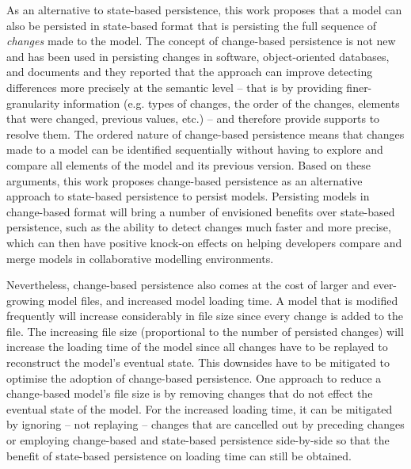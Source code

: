 \documentclass[12pt, a4paper]{report} \usepackage[titletoc]{appendix}
\begin{document}
As an alternative to state-based persistence, this work proposes that a model can also be persisted in state-based format that is persisting the full sequence of \emph{changes} made to the model. The concept of change-based persistence is not new and has been used in persisting changes in software, object-oriented databases, and documents \cite{DBLP:journals/entcs/RobbesL07,DBLP:conf/sde/LippeO92,DBLP:conf/caise/IgnatN05} and they reported that the approach can improve detecting differences more precisely at the semantic level -- that is by providing finer-granularity information (e.g. types of changes, the order of the changes, elements that were changed, previous values, etc.) -- and therefore provide supports to resolve them. The ordered nature of change-based persistence means that changes made to a model can be identified sequentially without having to explore and compare all elements of the model and its previous version. Based on these arguments, this work proposes change-based persistence as an alternative approach to state-based persistence to persist models. Persisting models in change-based format will bring a number of envisioned benefits over state-based persistence, such as the ability to detect changes much faster and more precise, which can then have positive knock-on effects on helping developers compare and merge models in collaborative modelling environments. 

Nevertheless, change-based persistence also comes at the cost of larger and ever-growing model files, and increased model loading time. A model that is modified frequently will increase considerably in file size since every change is added to the file. The increasing file size (proportional to the number of persisted changes) will increase the loading time of the model since all changes have to be replayed to reconstruct the model's eventual state. This downsides have to be mitigated to optimise the adoption of change-based persistence. One approach to reduce a change-based model's file size is by removing changes that do not effect the eventual state of the model. For the increased loading time, it can be mitigated by ignoring -- not replaying -- changes that are cancelled out by preceding changes or employing change-based and state-based persistence side-by-side so that the benefit of state-based persistence on loading time can still be obtained.   
\end{document}
